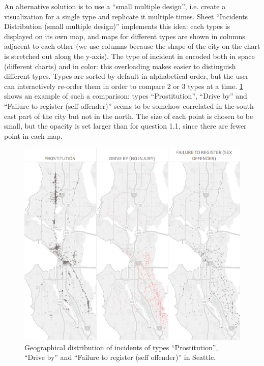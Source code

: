 An alternative solution is to use a ``small multiple design'', i.e. create a visualization for a single type and replicate it multiple times.
Sheet ``Incidents Distribution (small multiple design)'' implements this idea:
each types is displayed on its own map, and maps for different types are shown in columns adjacent to each other (we use columns because the shape of the city on the chart is stretched out along the y-axis).
The type of incident in encoded both in space (different charts) and in color:
this overloading makes easier to distinguish different types.
Types are sorted by default in alphabetical order, but the user can interactively re-order them in order to compare $2$ or $3$ types at a time.
\cref{fig:1_2_geographical_distribution_comparison} shows an example of such a comparison:
types ``Prostitution'', ``Drive by'' and ``Failure to register (seff offender)'' seems to be somehow correlated in the south-east part of the city but not in the north.
The size of each point is chosen to be small, but the opacity is set larger than for question 1.1, since there are fewer point in each map.

\begin{figure}[h]
	\centering
	\includegraphics[width=.75\columnwidth]{figures/1_2_geographical_distribution_comparison}
	\caption{Geographical distribution of incidents of types ``Prostitution'', ``Drive by'' and ``Failure to register (seff offender)'' in Seattle.} 
	\label{fig:1_2_geographical_distribution_comparison}
\end{figure}


